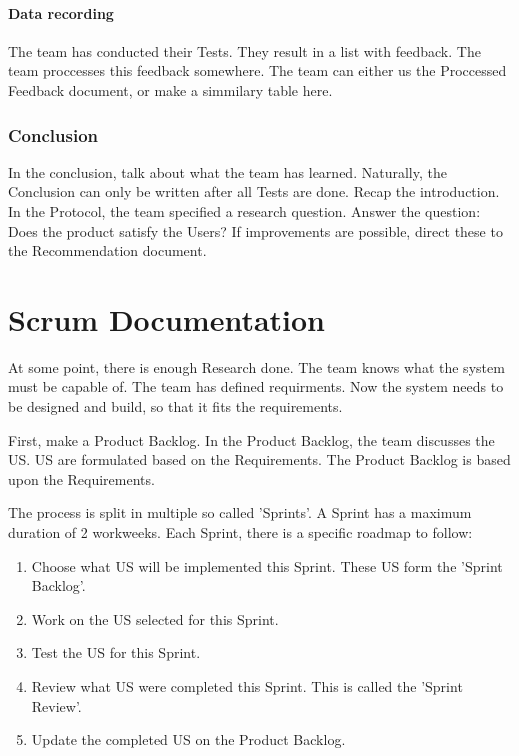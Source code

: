 \documentclass[10pt]{report}
\begin{document}
\subsubsection{Data recording}

The team has conducted their Tests. They result in a list with feedback. The team proccesses this feedback somewhere. The team can either us the Proccessed Feedback document, or make a simmilary table here.

\subsection{Conclusion}

In the conclusion, talk about what the team has learned. Naturally, the Conclusion can only be written after all Tests are done. Recap the introduction. In the Protocol, the team specified a research question. Answer the question: Does the product satisfy the Users? If improvements are possible, direct these to the Recommendation document. 

\newpage

\chapter{Scrum Documentation}
\thispagestyle{fancy}

At some point, there is enough Research done. The team knows what the system must be capable of. The team has defined requirments. Now the system needs to be designed and build, so that it fits the requirements.

First, make a Product Backlog. In the Product Backlog, the team discusses the US. US are formulated based on the Requirements. The Product Backlog is based upon the Requirements.

The process is split in multiple so called 'Sprints'. A Sprint has a maximum duration of 2 workweeks. Each Sprint, there is a specific roadmap to  follow:

\begin{enumerate}
	\item Choose what US will be implemented this Sprint. These US form the 'Sprint Backlog'.
	\item Work on the US selected for this Sprint.
	\item Test the US for this Sprint.
	\item Review what US were completed this Sprint. This is called the 'Sprint Review'.
	\item Update the completed US on the Product Backlog.
\end{enumerate}
\end{document}
